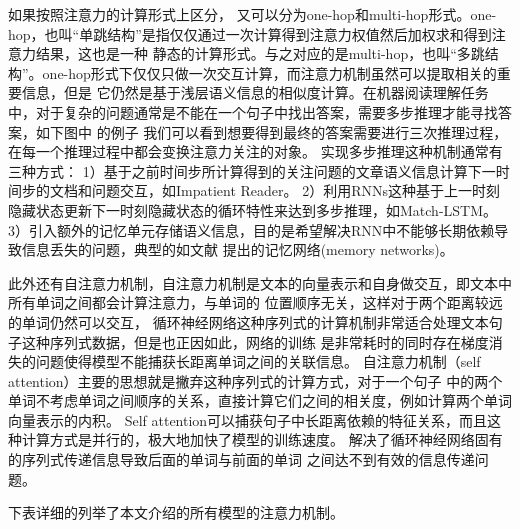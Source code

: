 如果按照注意力的计算形式上区分，
又可以分为one-hop和multi-hop形式。one-hop，也叫“单跳结构”是指仅仅通过一次计算得到注意力权值然后加权求和得到注意力结果，这也是一种
静态的计算形式。与之对应的是multi-hop，也叫“多跳结构”。one-hop形式下仅仅只做一次交互计算，而注意力机制虽然可以提取相关的重要信息，但是
它仍然是基于浅层语义信息的相似度计算。在机器阅读理解任务中，对于复杂的问题通常是不能在一个句子中找出答案，需要多步推理才能寻找答案，如下图中
的例子
我们可以看到想要得到最终的答案需要进行三次推理过程，在每一个推理过程中都会变换注意力关注的对象。
实现多步推理这种机制通常有三种方式：
1）基于之前时间步所计算得到的关注问题的文章语义信息计算下一时间步的文档和问题交互，如Impatient Reader。
2）利用RNNs这种基于上一时刻隐藏状态更新下一时刻隐藏状态的循环特性来达到多步推理，如Match-LSTM。
3）引入额外的记忆单元存储语义信息，目的是希望解决RNN中不能够长期依赖导致信息丢失的问题，典型的如文献\cite{memory networks}
提出的记忆网络(memory networks)。

此外还有自注意力机制，自注意力机制是文本的向量表示和自身做交互，即文本中所有单词之间都会计算注意力，与单词的
位置顺序无关，这样对于两个距离较远的单词仍然可以交互，
循环神经网络这种序列式的计算机制非常适合处理文本句子这种序列式数据，但是也正因如此，网络的训练
是非常耗时的同时存在梯度消失的问题使得模型不能捕获长距离单词之间的关联信息。
自注意力机制（self attention）主要的思想就是撇弃这种序列式的计算方式，对于一个句子
中的两个单词不考虑单词之间顺序的关系，直接计算它们之间的相关度，例如计算两个单词向量表示的内积。
Self attention可以捕获句子中长距离依赖的特征关系，而且这种计算方式是并行的，极大地加快了模型的训练速度。
解决了循环神经网络固有的序列式传递信息导致后面的单词与前面的单词
之间达不到有效的信息传递问题。

下表详细的列举了本文介绍的所有模型的注意力机制。

